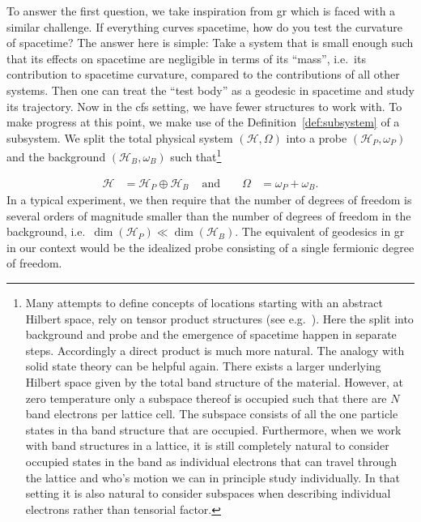 \documentclass[reqno,11pt]{amsart}
\renewcommand{\H}{\mathcal{H}}
\numberwithin{equation}{section}
\begin{document}
To answer the first question, we take inspiration from \ac{gr} which is faced with a similar challenge.
If everything curves spacetime, how do you test the curvature of spacetime?
The answer here is simple: Take a system that is small enough such that its effects on spacetime are negligible
in terms of its ``mass'', i.e.~its contribution to spacetime curvature, compared to the contributions of all other systems.
Then one can treat the ``test body'' as a geodesic in spacetime and study its trajectory.
Now in the \ac{cfs} setting, we have fewer structures to work with.
To make progress at this point, we make use of the Definition~\ref{def:subsystem} of a subsystem.
We split the total physical system $(\H, \Omega)$ into a probe $(\H_P, \omega_P)$ and the background $(\H_B, \omega_B)$ such that\footnote{
    Many attempts to define concepts of locations starting with an abstract Hilbert space, rely on tensor product structures (see e.g.~\cite{niederklapfer2024fundamental,franzmann2024or,zanardi2004quantum}).
    Here the split into background and probe and the emergence of spacetime happen in separate steps.
    Accordingly a direct product is much more natural.
    The analogy with solid state theory can be helpful again. There exists a larger underlying Hilbert space given by the total band structure of the material. However, at zero temperature only a subspace thereof is occupied such that there are $N$ band electrons per lattice cell. The subspace consists of all the one particle states in tha band structure that are occupied. 
    Furthermore, when we work with band structures in a lattice, it is still completely natural to consider occupied states in the band
    as individual electrons that can travel through the lattice and who's motion we can in principle study individually.
    In that setting it is also natural to consider subspaces when describing individual electrons rather than tensorial factor.
}







\begin{align}
    \H &= \H_P \oplus \H_B &\text{ and }&& \Omega &= \omega_P +  \omega_B.
\end{align}
In a typical experiment, we then require that the number of degrees of freedom is several orders of magnitude smaller than
the number of degrees of freedom in the background, i.e.~$\dim (\H_P) \ll \dim (\H_B)$.
The equivalent of geodesics in \ac{gr} in our context would be the idealized probe consisting of a single fermionic
degree of freedom.
\end{document}
